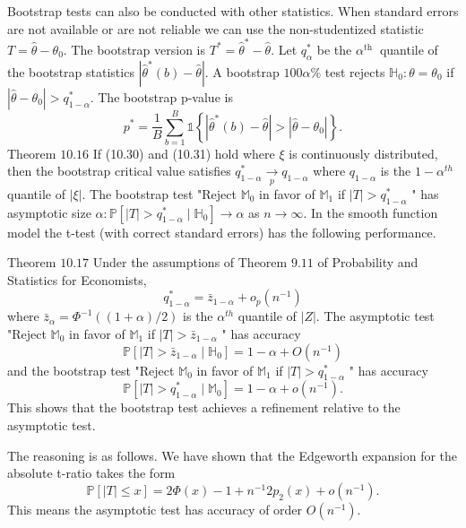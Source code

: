\documentclass[10pt]{article}
\begin{document}
Bootstrap tests can also be conducted with other statistics. When standard errors are not available or are not reliable we can use the non-studentized statistic $T=\widehat{\theta}-\theta_{0}$. The bootstrap version is $T^{*}=\widehat{\theta}^{*}-\widehat{\theta}$. Let $q_{\alpha}^{*}$ be the $\alpha^{\text {th }}$ quantile of the bootstrap statistics $\left|\widehat{\theta}^{*}(b)-\widehat{\theta}\right|$. A bootstrap $100 \alpha \%$ test rejects $\mathbb{H}_{0}: \theta=\theta_{0}$ if $\left|\widehat{\theta}-\theta_{0}\right|>q_{1-\alpha}^{*}$. The bootstrap p-value is
$$
p^{*}=\frac{1}{B} \sum_{b=1}^{B} \mathbb{1}\left\{\left|\widehat{\theta}^{*}(b)-\widehat{\theta}\right|>\left|\widehat{\theta}-\theta_{0}\right|\right\} .
$$
Theorem $10.16$ If (10.30) and (10.31) hold where $\xi$ is continuously distributed, then the bootstrap critical value satisfies $q_{1-\alpha}^{*} \underset{p}{\longrightarrow} q_{1-\alpha}$ where $q_{1-\alpha}$ is the $1-\alpha^{t h}$ quantile of $|\xi|$. The bootstrap test "Reject $\mathbb{M}_{0}$ in favor of $\mathbb{M}_{1}$ if $|T|>q_{1-\alpha}^{*}$ " has asymptotic size $\alpha: \mathbb{P}\left[|T|>q_{1-\alpha}^{*} \mid \mathbb{H}_{0}\right] \longrightarrow \alpha$ as $n \rightarrow \infty$. In the smooth function model the t-test (with correct standard errors) has the following performance.

Theorem $10.17$ Under the assumptions of Theorem $9.11$ of Probability and Statistics for Economists,
$$
q_{1-\alpha}^{*}=\bar{z}_{1-\alpha}+o_{p}\left(n^{-1}\right)
$$
where $\bar{z}_{\alpha}=\Phi^{-1}((1+\alpha) / 2)$ is the $\alpha^{t h}$ quantile of $|Z|$. The asymptotic test "Reject $\mathbb{M}_{0}$ in favor of $\mathbb{M}_{1}$ if $|T|>\bar{z}_{1-\alpha}$ " has accuracy
$$
\mathbb{P}\left[|T|>\bar{z}_{1-\alpha} \mid \mathbb{H}_{0}\right]=1-\alpha+O\left(n^{-1}\right)
$$
and the bootstrap test "Reject $\mathbb{M}_{0}$ in favor of $\mathbb{M}_{1}$ if $|T|>q_{1-\alpha}^{*}$ " has accuracy
$$
\mathbb{P}\left[|T|>q_{1-\alpha}^{*} \mid \mathbb{M}_{0}\right]=1-\alpha+o\left(n^{-1}\right) .
$$
This shows that the bootstrap test achieves a refinement relative to the asymptotic test.

The reasoning is as follows. We have shown that the Edgeworth expansion for the absolute t-ratio takes the form
$$
\mathbb{P}[|T| \leq x]=2 \Phi(x)-1+n^{-1} 2 p_{2}(x)+o\left(n^{-1}\right) .
$$
This means the asymptotic test has accuracy of order $O\left(n^{-1}\right)$.
\end{document}
